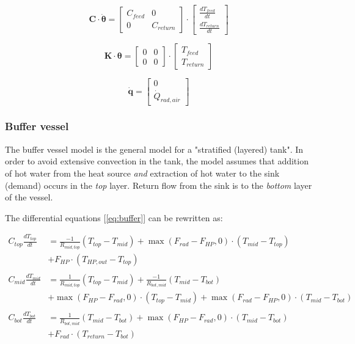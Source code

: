 \begin{equation}
	\mathbf{C} \cdot \boldsymbol{\dot{\theta}} =
	\begin{bmatrix}
		C_{feed} & 0 \\
		0 &  C_{return}
	\end{bmatrix}
	\cdot
	\begin{bmatrix}
		\frac{dT_{feed}}{dt} \\
		\frac{dT_{return}}{dt}
	\end{bmatrix}
\end{equation}

\begin{equation}
	\mathbf{K} \cdot \boldsymbol{\theta} =
	\begin{bmatrix}
		0 & 0 \\
		0 &  0
	\end{bmatrix}
	\cdot
	\begin{bmatrix}
		T_{feed} \\
		T_{return}
	\end{bmatrix}
\end{equation}

\begin{equation}
	\mathbf{\dot{q}} =
	\begin{bmatrix}
		0 \\
		\dot{Q}_{rad, air}
	\end{bmatrix}
\end{equation}

\subsubsection{Buffer vessel}

The buffer vessel model is the general model for a "stratified (layered) tank". In order to avoid extensive convection in the tank, the model assumes that addition of hot water from the heat source \emph{and} extraction of hot water to the sink (demand) occurs in the \emph{top} layer.  Return flow from the sink is to the \emph{bottom} layer of the vessel.

The differential equations [\ref{eq:buffer}] can be rewritten as:

{\color{teal}
	\begin{equation}
		\begin{aligned}
			C_{top}\frac{dT_{top}}{dt} &= \frac{-1}{R_{mid, top}} (T_{top}-T_{mid}) + \max(F_{rad}-F_{HP}, 0) \cdot (T_{mid} - T_{top}) \\
			&+ F_{HP} \cdot (T_{HP,out} - T_{top})
			\\ \\
			C_{mid}\frac{dT_{mid}}{dt} &= \frac{1}{R_{mid, top}} (T_{top}-T_{mid}) + \frac{-1}{R_{bot, mid}}(T_{mid}-T_{bot}) \\
			& + \max(F_{HP}-F_{rad}, 0) \cdot (T_{top} - T_{mid}) + \max(F_{rad}-F_{HP}, 0)  \cdot (T_{mid} - T_{bot}) 
			\\ \\
			C_{bot}\frac{dT_{bot}}{dt} &= \frac{1}{R_{bot, mid}} (T_{mid}-T_{bot}) + \max(F_{HP} - F_{rad}, 0) \cdot (T_{mid} - T_{bot})\\
			& + F_{rad} \cdot (T_{return} - T_{bot}) 
		\end{aligned}
	\end{equation}
}

